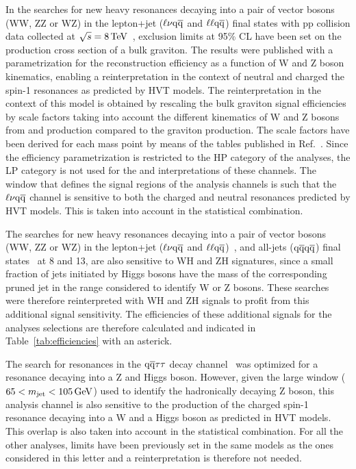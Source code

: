 In the searches for new heavy resonances decaying into a pair of vector bosons (WW, ZZ or WZ) in the lepton+jet ($\ell \nu \mathrm{q}\overline{\mathrm{q}}$ and $\ell\ell \mathrm{q}\overline{\mathrm{q}}$) final states with pp collision data collected at $\sqrt{s} = 8\,\text{Te\hspace{-.08em}V}$~\cite{Khachatryan:2014gha}, exclusion limits at 95\% CL have been set on the production cross section of a bulk graviton.
The results were published with a parametrization for the reconstruction efficiency as a function of W and Z boson kinematics, enabling a reinterpretation in the context of neutral and charged the spin-1 resonances as predicted by HVT models.
The reinterpretation in the context of this model is obtained by rescaling the bulk graviton signal efficiencies by scale factors taking into account the different kinematics of W and Z bosons from \PWpr{} and \cPZpr{} production compared to the graviton production.
The scale factors have been derived for each mass point by means of the tables published in Ref.~\cite{Khachatryan:2014gha}.
Since the efficiency parametrization is restricted to the HP category of the analyses, the LP category is not used for the \PWpr{} and \cPZpr{} interpretations of these channels.
The \mJ window that defines the signal regions of the analysis channels is such that the $\ell \nu \mathrm{q}\overline{\mathrm{q}}$ channel is sensitive to both the charged and neutral resonances predicted by HVT models. This is taken into account in the statistical combination.

The searches for new heavy resonances decaying into a pair of vector bosons (WW, ZZ or WZ) in the lepton+jet ($\ell \nu \mathrm{q}\overline{\mathrm{q}}$ and $\ell\ell \mathrm{q}\overline{\mathrm{q}}$)~\cite{Khachatryan:2014gha,Khachatryan:2014gha,CMS-PAS-EXO-15-002}, and all-jets ($\mathrm{q}\overline{\mathrm{q}} \mathrm{q}\overline{\mathrm{q}}$) final states~\cite{Khachatryan:2014hpa,CMS-PAS-EXO-15-002} at 8 and 13\TeV, are also sensitive to WH and ZH signatures, since a small fraction of jets initiated by Higgs bosons
have the mass of the corresponding pruned jet in the range considered to identify W or Z bosons.
These searches were therefore reinterpreted with WH and ZH signals to profit from this additional signal sensitivity.
The efficiencies of these additional signals for the analyses selections are therefore calculated and indicated in Table~\ref{tab:efficiencies} with an asterick.

The search for resonances in the $\mathrm{q}\overline{\mathrm{q}} \tau\tau$ decay channel~\cite{Khachatryan:2015bma} was optimized for a resonance \Zpr decaying into a Z and Higgs boson.
However, given the large \mJ window ($65 <  m_{\text{jet}} < 105\,\text{Ge\hspace{-.08em}V}$) used to identify the hadronically decaying Z boson, this analysis channel is also sensitive to the production of the charged spin-1 \Wpr resonance decaying into a W and a Higgs boson as predicted in HVT models. This overlap is also taken into account in the statistical combination.
For all the other analyses, limits have been previously set in the same models as the ones considered in this letter and a reinterpretation is therefore not needed.

